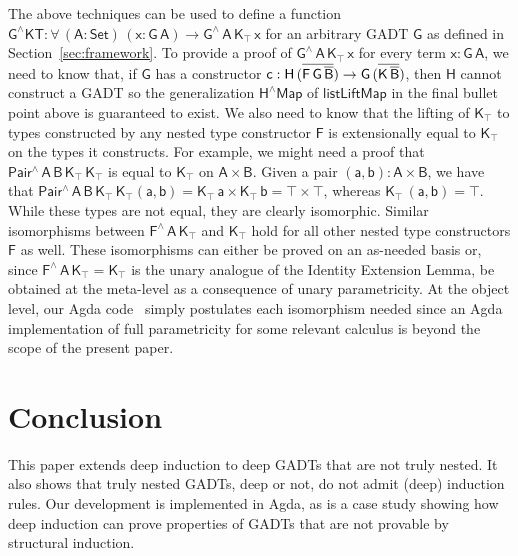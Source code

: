 \documentclass[9pt]{entcs}
\begin{document}
The above techniques can be used to define a function
$\mathsf{G^\wedge KT : \forall\, (A : Set)\, (x : G\,A) \to
  G^{\wedge}\, A\, K_\top\, x}$ for an arbitrary GADT $\mathsf{G}$ as
defined in Section~\ref{sec:framework}.  To provide a proof of
$\mathsf{G^{\wedge}\, A\, K_\top \, x}$ for every term $\mathsf{x :
  G\, A}$, we need to know that, if $\mathsf{G}$ has a constructor
$\mathsf{c : H \, (\overline{F\,G\, \overline{B}}) \to G\, (\overline{K\,\overline{B}})}$,
then $\mathsf{H}$ cannot construct a GADT so the generalization
$\mathsf{H^\wedge Map}$ of $\mathsf{listLiftMap}$ in the final bullet
point above is guaranteed to exist. We also need to know that the
lifting of $\mathsf{K_\top}$ to types constructed by any nested type
constructor $\mathsf{F}$ is extensionally equal to $\mathsf{K_\top}$
on the types it constructs. For example, we might need a proof that
$\mathsf{Pair^{\wedge}\,A\,B\,K_\top\,K_\top}$ is equal to
$\mathsf{K_\top}$ on $\mathsf{A \times B}$.  Given a pair $\mathsf{(a
  , b) : A \times B}$, we have that
$\mathsf{Pair^{\wedge}\,A\,B\,K_\top\,K_\top (a, b) = K_\top \, a
  \times K_\top\, b = \top \times \top}$, whereas $\mathsf{K_\top\,
  (a, b) = \top}$. While these types are not equal, they are clearly
isomorphic. Similar isomorphisms between
$\mathsf{F^{\wedge}\,A\,K_\top}$ and $\mathsf{K_\top}$ hold for all
other nested type constructors $\mathsf{F}$ as well. These
isomorphisms can either be proved on an as-needed basis or, since
$\mathsf{F^\wedge\,A\,K_\top = K_\top}$ is the unary analogue of the
Identity Extension Lemma, be obtained at the meta-level as a
consequence of unary parametricity. At the object level, our Agda
code~\cite{web-page} simply postulates each isomorphism needed since
an Agda implementation of full parametricity for some relevant
calculus is beyond the scope of the present paper.

\section{Conclusion}\label{sec:conclusion}

This paper extends deep induction to deep GADTs that are not truly
nested. It also shows that truly nested GADTs, deep or not, do not
admit (deep) induction rules. Our development is implemented in Agda,
as is a case study showing how deep induction can prove properties of
GADTs that are not provable by structural induction.

\pagebreak
\end{document}
